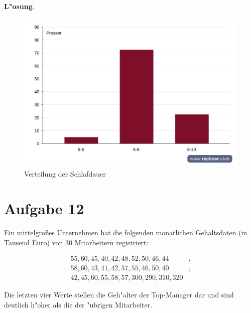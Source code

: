 \documentclass[10pt, a4paper, oneside]{article}
\begin{document}
\textbf{L"osung}.

\begin{figure}[h]
    \centering
    \includegraphics[width=1\textwidth]{./assets/saeulendiagramm-02.png}
    \caption{Verteilung der Schlafdauer}
\end{figure}

\pagebreak
\section{Aufgabe 12}

Ein mittelgroßes Unternehmen hat die folgenden monatlichen Gehaltsdaten (in
Tausend Euro) von 30 Mitarbeitern registriert:

\begin{align*}
        55, 60, 45, 40, 42, 48, 52, 50, 46, 44&,\\
        58, 60, 43, 41, 42, 57, 55, 46, 50, 40&,\\
    42, 45, 60, 55, 58, 57, 300, 290, 310, 320&
\end{align*}

Die letzten vier Werte stellen die Geh"alter der Top-Manager dar und sind
deutlich h"oher als die der "ubrigen Mitarbeiter.
\end{document}

